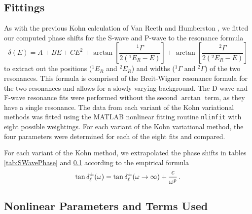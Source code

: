 \documentclass[preprint,showpacs,preprintnumbers,amsmath,amssymb]{revtex4}
\begin{document}
\subsection{Fittings}
As with the previous Kohn calculation of Van Reeth and Humberston \cite{VanReeth2004}, we fitted our computed phase shifts for the S-wave and P-wave to the resonance formula
\begin{equation}
\label{eq:ResonanceFit}
\delta(E) = A + B E + C E^2 + \arctan \left[ \frac{^1\Gamma}{2(^1E_R - E)} \right] + \arctan \left[ \frac{^2\Gamma}{2(^2E_R - E)} \right]
\end{equation}
to extract out the positions ($^1E_R$ and $^2E_R$) and widths
($^1\Gamma$ and $^2\Gamma$) of the two resonances. 
This formula is comprised of the Breit-Wigner resonance
formula for the two resonances and allows for a slowly varying
background. The D-wave and F-wave resonance fits were performed without the second $\arctan$ term, as they have a single resonance. 
The data from each variant of the Kohn variational methods was fitted using the MATLAB nonlinear fitting routine \texttt{nlinfit} with eight possible weightings.
For each variant of the Kohn variational method, the four parameters were determined for each of the eight fits and compared.

For each variant of the Kohn method, we extrapolated the phase shifts in tables \ref{tab:SWavePhase} and \ref{} according to the empirical formula \cite{VanReeth2003}
\begin{equation}
\label{eq:Extrap}
\tan\delta_\ell^\pm(\omega) = \tan\delta_\ell^\pm(\omega\to\infty) + {c\over \omega^p}\, .
\end{equation}


\subsection{Nonlinear Parameters and Terms Used}
\label{sec:Parameters}
\end{document}
